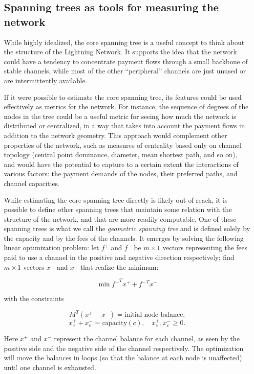 \documentclass[a4paper]{article}
\begin{document}
\subsection{Spanning trees as tools for measuring the network}

While highly idealized, the core spanning tree is a useful concept to think about the structure of the Lightning Network. It supports the idea that the network could have a tendency to concentrate payment flows through a small backbone of stable channels, while most of the other ``peripheral'' channels are just unused or are intermittently available.

If it were possible to estimate the core spanning tree, its features could be used effectively as metrics for the network. For instance, the sequence of degrees of the nodes in the tree could be a useful metric for seeing how much the network is distributed or centralized, in a way that takes into account the payment flows in addition to the network geometry. This approach would complement other properties of the network, such as measures of centrality based only on channel topology (central point dominance, diameter, mean shortest path, and so on), and would have the potential to capture to a certain extent the interactions of various factors: the payment demands of the nodes, their preferred paths, and channel capacities.

While estimating the core spanning tree directly is likely out of reach, it is possible to define other spanning trees that maintain some relation with the structure of the network, and that are more readily computable. One of these spanning trees is what we call the \emph{geometric spanning tree} and is defined solely by the capacity and by the fees of the channels. It emerges by solving the following linear optimization problem: let $f^+$ and $f^-$ be $m \times 1$ vectors representing the fees paid to use a channel in the positive and negative direction respectively; find $m \times 1$ vectors $x^+$ and $x^-$ that realize the minimum:

\begin{equation}
\min {f^+}^T x^+ + {f^-}^T x^-
\end{equation}

with the constraints

$$M^T (x^+ - x^-) = \textrm{initial node balance,}$$
$$x_c^+ + x_c^- = \textrm{capacity}(c), \quad x_c^+, x_c^- \geq 0 .$$

Here $x^+$ and $x^-$ represent the channel balance for each channel, as seen by the positive side and the negative side of the channel respectively. The optimization will move the balances in loops (so that the balance at each node is unaffected) until one channel is exhausted.
\end{document}
